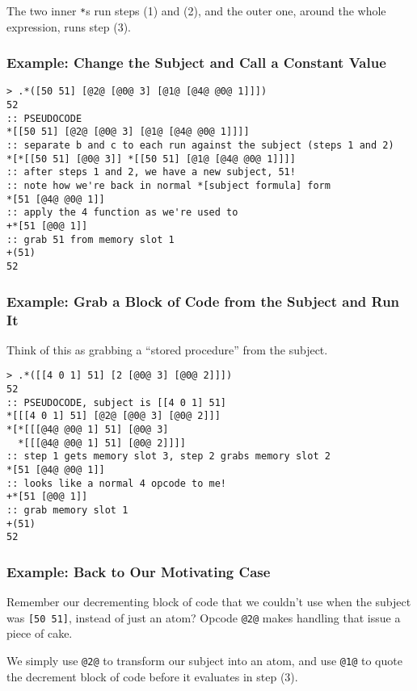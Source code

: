\documentclass[twoside]{article}
\begin{document}
The two inner \lstinline[style=inlinecode]{*}s run steps (1) and (2), and the outer one, around the whole expression, runs step (3).

\subsubsection{Example:  Change the Subject and Call a Constant Value}

\begin{lstlisting}[style=listingcode]
> .*([50 51] [@2@ [@0@ 3] [@1@ [@4@ @0@ 1]]])
52
:: PSEUDOCODE
*[[50 51] [@2@ [@0@ 3] [@1@ [@4@ @0@ 1]]]]
:: separate b and c to each run against the subject (steps 1 and 2)
*[*[[50 51] [@0@ 3]] *[[50 51] [@1@ [@4@ @0@ 1]]]]
:: after steps 1 and 2, we have a new subject, 51!
:: note how we're back in normal *[subject formula] form
*[51 [@4@ @0@ 1]]
:: apply the 4 function as we're used to
+*[51 [@0@ 1]]
:: grab 51 from memory slot 1
+(51)
52
\end{lstlisting}

\subsubsection{Example:  Grab a Block of Code from the Subject and Run It}

Think of this as grabbing a “stored procedure” from the subject.

\begin{lstlisting}[style=listingcode]
> .*([[4 0 1] 51] [2 [@0@ 3] [@0@ 2]]])
52
:: PSEUDOCODE, subject is [[4 0 1] 51]
*[[[4 0 1] 51] [@2@ [@0@ 3] [@0@ 2]]]
*[*[[[@4@ @0@ 1] 51] [@0@ 3]
  *[[[@4@ @0@ 1] 51] [@0@ 2]]]]
:: step 1 gets memory slot 3, step 2 grabs memory slot 2
*[51 [@4@ @0@ 1]]
:: looks like a normal 4 opcode to me!
+*[51 [@0@ 1]]
:: grab memory slot 1
+(51)
52
\end{lstlisting}

\subsubsection{Example:  Back to Our Motivating Case}

Remember our decrementing block of code that we couldn't use when the subject was \lstinline[style=inlinecode]{[50 51]}, instead of just an atom? Opcode \lstinline[style=inlinecode]{@2@} makes handling that issue a piece of cake.

We simply use \lstinline[style=inlinecode]{@2@} to transform our subject into an atom, and use \lstinline[style=inlinecode]{@1@} to quote the decrement block of code before it evaluates in step (3).
\end{document}
